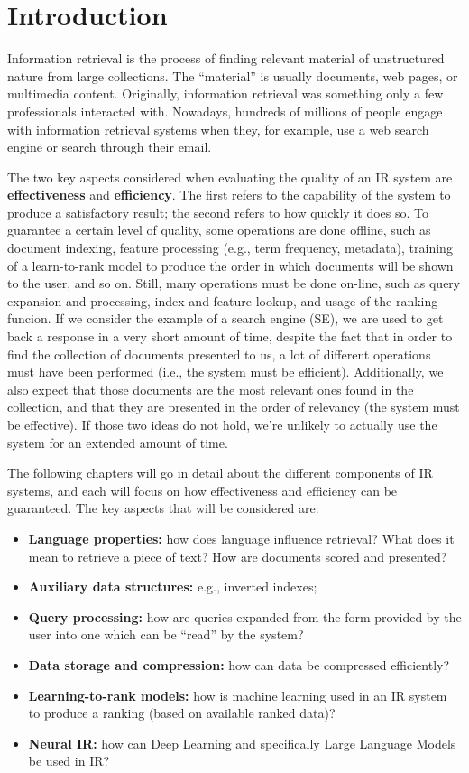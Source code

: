\chapter{Introduction}

Information retrieval is the process of finding relevant material of unstructured nature from large collections. The ``material'' is usually documents, web pages, or multimedia content. Originally, information retrieval was something only a few professionals interacted with. Nowadays, hundreds of millions of people engage with information retrieval systems when they, for example, use a web search engine or search through their email.

The two key aspects considered when evaluating the quality of an IR system are \textbf{effectiveness} and \textbf{efficiency}. The first refers to the capability of the system to produce a satisfactory result; the second refers to how quickly it does so. To guarantee a certain level of quality, some operations are done offline, such as document indexing, feature processing (e.g., term frequency, metadata), training of a learn-to-rank model to produce the order in which documents will be shown to the user, and so on. Still, many operations must be done on-line, such as query expansion and processing, index and feature lookup, and usage of the ranking funcion. If we consider the example of a search engine (SE), we are used to get back a response in a very short amount of time, despite the fact that in order to find the collection of documents presented to us, a lot of different operations must have been performed (i.e., the system must be efficient). Additionally, we also expect that those documents are the most relevant ones found in the collection, and that they are presented in the order of relevancy (the system must be effective). If those two ideas do not hold, we're unlikely to actually use the system for an extended amount of time.

The following chapters will go in detail about the different components of IR systems, and each will focus on how effectiveness and efficiency can be guaranteed. The key aspects that will be considered are:
\begin{itemize}
    \item \textbf{Language properties:} how does language influence retrieval? What does it mean to retrieve a piece of text? How are documents scored and presented?
    \item \textbf{Auxiliary data structures:} e.g., inverted indexes;
    \item \textbf{Query processing:} how are queries expanded from the form provided by the user into one which can be ``read'' by the system?
    \item \textbf{Data storage and compression:} how can data be compressed efficiently?
    \item \textbf{Learning-to-rank models:} how is machine learning used in an IR system to produce a ranking (based on available ranked data)?
    \item \textbf{Neural IR:} how can Deep Learning and specifically Large Language Models be used in IR?
\end{itemize}